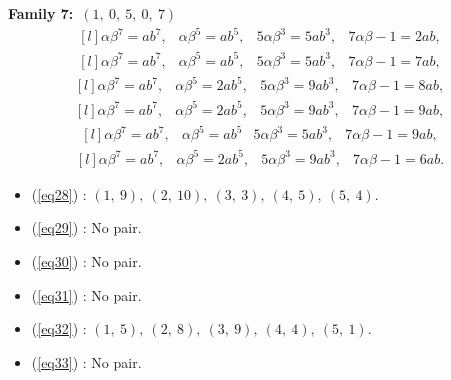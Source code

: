 \documentclass[12pt,a4wide, reqno]{amsart}
\theoremstyle{definition}
\theoremstyle{remark}
\numberwithin{equation}{section}
\begin{document}
\textbf{Family 7:}~$(1,~0,~5,~0,~7)$ 
\begin{equation}\label{eq28}
    \begin{matrix*}[l]
         \alpha \beta ^7=ab^7, & \alpha \beta ^5=ab^5, & 5\alpha \beta ^3=5ab ^3, & 7\alpha\beta-1=2ab,
    \end{matrix*}
\end{equation}
\begin{equation}\label{eq29}
    \begin{matrix*}[l]
          \alpha \beta ^7=ab^7, & \alpha \beta ^5=ab^5, & 5\alpha \beta ^3=5ab ^3, & 7\alpha\beta-1=7ab,
    \end{matrix*}
\end{equation}
\begin{equation}\label{eq30}
    \begin{matrix*}[l]
          \alpha \beta ^7=ab^7, & \alpha \beta ^5=2ab^5, & 5\alpha \beta ^3=9ab ^3, & 7\alpha\beta-1=8ab,
    \end{matrix*}
\end{equation}
\begin{equation}\label{eq31}
    \begin{matrix*}[l]
          \alpha \beta ^7=ab^7, & \alpha \beta ^5=2ab^5, & 5\alpha \beta ^3=9ab^3, & 7\alpha\beta-1=9ab,
    \end{matrix*}
\end{equation}
\begin{equation}\label{eq32}
    \begin{matrix*}[l]
          \alpha \beta ^7=ab^7, & \alpha \beta ^5=ab^5 & 5\alpha \beta ^3=5ab ^3, & 7\alpha\beta-1=9ab,
    \end{matrix*}
\end{equation}
\begin{equation}\label{eq33}
    \begin{matrix*}[l]
          \alpha \beta ^7=ab^7, & \alpha \beta ^5=2ab^5, & 5\alpha \beta ^3=9ab ^3, & 7\alpha\beta-1=6ab.
    \end{matrix*}
\end{equation}

\begin{itemize}
    \item 
    (\ref{eq28}) : $(1,~9),~(2,~10),~(3,~3),~(4,~5),~(5,~4).$
    \item 
    (\ref{eq29}) : No pair.
    \item 
    (\ref{eq30}) : No pair.
    \item 
    (\ref{eq31}) : No pair.
    \item 
    (\ref{eq32}) : $(1,~5),~(2,~8),~(3,~9),~(4,~4),~(5,~1).$
    \item
    (\ref{eq33}) : No pair.
    \end{itemize}
\end{document}
